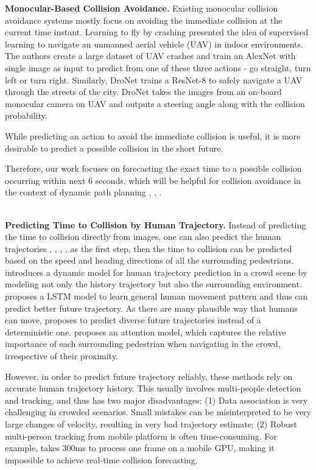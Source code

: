 \noindent
\textbf{Monocular-Based Collision Avoidance.} Existing monocular collision avoidance systems mostly focus on avoiding the immediate collision at the current time instant. Learning to fly by crashing \cite{gandhi} presented the idea of supervised learning to navigate an unmanned aerial vehicle (UAV) in indoor environments. The authors create a large dataset of UAV crashes and train an AlexNet \cite{alexnet} with single image as input to predict from one of these three actions - go straight, turn left or turn right. Similarly, DroNet \cite{DroNet} trains a ResNet-8 \cite{resnet} to safely navigate a UAV through the streets of the city.
DroNet takes the images from an on-board monocular camera on UAV and outputs a steering angle along with the collision probability. 

While predicting an action to avoid the immediate collision is useful, it is more desirable to predict a possible collision in the short future.

Therefore, our work focuses on forecasting the exact time to a possible collision occurring within next 6 seconds, which will be helpful for collision avoidance in the context of dynamic path planning \cite{SIPP}, \cite{time-bounded}, \cite{vemula2016path}.   


\noindent\\
\textbf{Predicting Time to Collision by Human Trajectory.}
Instead of predicting the time to collision directly from images, one can also predict the human trajectories \cite{socialGAN}, \cite{socialLSTM}, \cite{anirudh}, \cite{2009YoullNW}, \cite{ziebart2009planning} as the first step, then the time to collision can be predicted based on the speed and heading directions of all the surrounding pedestrians.
\cite{2009YoullNW} introduces a dynamic model for human trajectory prediction in a crowd scene by modeling not only the history trajectory but also the surrounding environment. \cite{socialLSTM} proposes a LSTM model to learn general human movement pattern and thus can predict better future trajectory. As there are many plausible way that humans can move, \cite{socialGAN} proposes to predict diverse future trajectories instead of a deterministic one. \cite{anirudh} proposes an attention model, which captures the relative importance of each surrounding pedestrian when navigating in the crowd, irrespective of their proximity.


However, in order to predict future trajectory reliably, these methods rely on accurate human trajectory history. This usually involves multi-people detection and tracking, and thus has two major disadvantages: (1) Data association is very challenging in crowded scenarios. Small mistakes can be misinterpreted to be very large changes of velocity, resulting in very bad trajectory estimate; (2) Robust multi-person tracking from mobile platform is often time-consuming. For example, \cite{Andreas} takes 300ms to process one frame on a mobile GPU, making it impossible to achieve real-time collision forecasting. 

